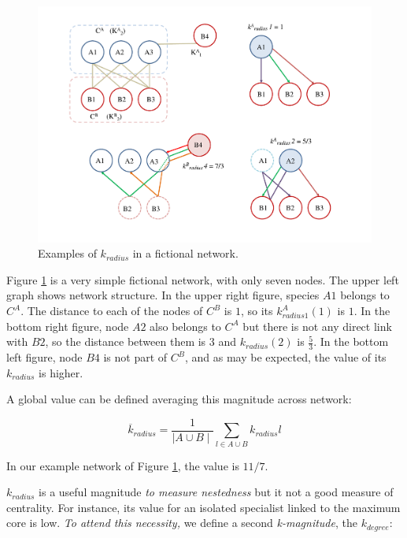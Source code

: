 \documentclass[12pt]{article}
\begin{document}
\begin{figure}[h!]
\centering
\includegraphics[scale=0.4]{red_example.pdf}
\caption {Examples of \textit{$k_{radius}$} in a fictional network.}
\label{fig:red_example}
\end{figure}

Figure \ref{fig:red_example} is a very simple fictional network, with only seven nodes. The upper left graph shows network structure. In the upper right figure, species $A1$ belongs to $C^{A}$.  The distance to each of the nodes of $C^{B}$ is $1$, so its \textit{$k^A_{radius1}(1)$} is $1$. In the bottom right figure, node  $A2$ also belongs to $C^{A}$ but there is not any direct link with $B2$, so the distance between them is $3$ and \textit{$k_{radius}(2)$} is $\frac{5}{3}$. In the bottom left figure, node $B4$ is not part of $C^{B}$, and as may be expected, the value of its \textit{$k_{radius}$} is higher. 

A global value can be defined averaging this magnitude across network:

\begin{equation}
\displaystyle
\overline {k}_{radius} = \frac{1}{\mid A \cup B \mid}\sum\limits_{l \in A \cup B} k_{radius}l
\label{avgkradius}
\end{equation}

In our example network of Figure \ref{fig:red_example}, the value is $11/7$. 

${k}_{radius}$ is a useful magnitude \emph{to measure nestedness} but it not a good measure of centrality. For instance, its value for an isolated specialist linked to the maximum core is low. \emph{To attend this necessity,} we define a second \textit{k-magnitude}, the ${k}_{degree}$:
\end{document}
